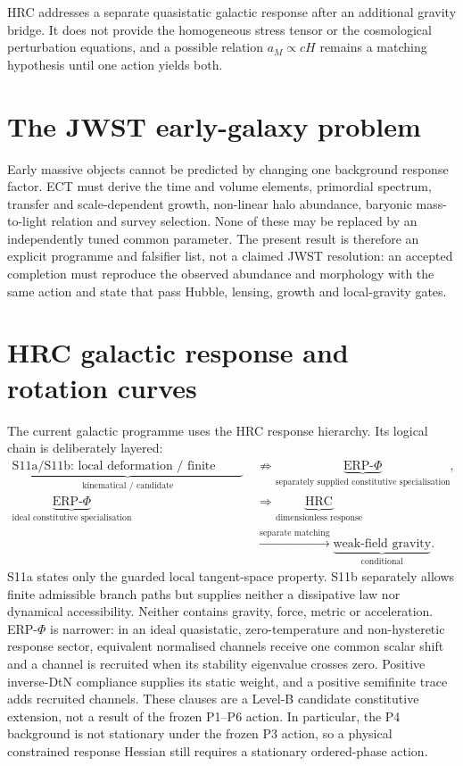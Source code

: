 \documentclass[11pt,a4paper]{article}
\begin{document}
HRC addresses a separate quasistatic galactic response after an additional
gravity bridge.  It does not provide the homogeneous stress tensor or the
cosmological perturbation equations, and a possible relation
$a_M\propto cH$ remains a matching hypothesis until one action yields both.

\section{The JWST early-galaxy problem}
\label{sec:pop_jwst}

Early massive objects cannot be predicted by changing one background
response factor.  ECT must derive the time and volume elements, primordial
spectrum, transfer and scale-dependent growth, non-linear halo abundance,
baryonic mass-to-light relation and survey selection.  None of these may be
replaced by an independently tuned common parameter.  The present result is
therefore an explicit programme and falsifier list, not a claimed JWST
resolution: an accepted completion must reproduce the observed abundance and
morphology with the same action and state that pass Hubble, lensing, growth
and local-gravity gates.

\section{HRC galactic response and rotation curves}
\label{sec:pop_galaxies}

The current galactic programme uses the HRC response hierarchy.  Its
logical chain is deliberately layered:
\begin{equation}
 \begin{aligned}
 \underbrace{\text{S11a/S11b: local deformation / finite paths}}_{\text{kinematical / candidate}}
&\ \not\Longrightarrow
 \underbrace{\text{ERP-$\Phi$}}_{\text{separately supplied constitutive specialisation}},
 \\[-1pt]
 \underbrace{\text{ERP-$\Phi$}}_{\text{ideal constitutive specialisation}}
&\ \Longrightarrow
 \underbrace{\text{HRC}}_{\text{dimensionless response}}\\[-1pt]
 &\ \xrightarrow{\text{separate matching}}
 \underbrace{\text{weak-field gravity}}_{\text{conditional}} .
 \end{aligned}
 \label{eq:pop_hrc_hierarchy}
\end{equation}
S11a states only the guarded local tangent-space property.  S11b separately
allows finite admissible branch paths but supplies neither a dissipative law
nor dynamical accessibility.  Neither contains gravity, force, metric or
acceleration.  ERP-$\Phi$ is narrower: in an ideal quasistatic,
zero-temperature and non-hysteretic response sector, equivalent normalised
channels receive one common scalar shift and a channel is recruited when its
stability eigenvalue crosses zero.  Positive inverse-DtN compliance supplies
its static weight, and a positive semifinite trace adds recruited channels.
These clauses are a Level-B candidate constitutive extension, not a result of
the frozen P1--P6 action.  In particular, the P4 background is not stationary
under the frozen P3 action, so a physical constrained response Hessian still
requires a stationary ordered-phase action.
\end{document}
